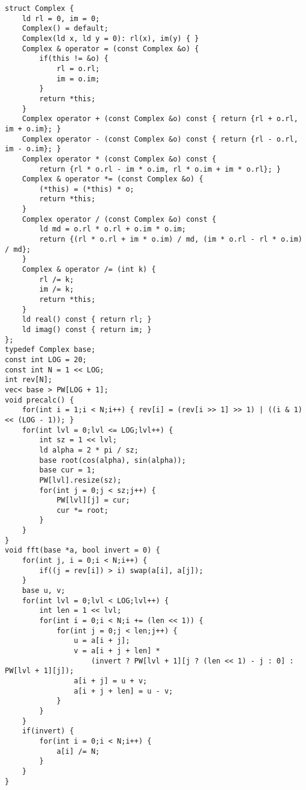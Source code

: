 \documentclass[12pt]{article}
\begin{document}
\begin{verbatim}
struct Complex {
    ld rl = 0, im = 0;
    Complex() = default;
    Complex(ld x, ld y = 0): rl(x), im(y) { }
    Complex & operator = (const Complex &o) {
        if(this != &o) {
            rl = o.rl;
            im = o.im;
        }
        return *this;
    }
    Complex operator + (const Complex &o) const { return {rl + o.rl, im + o.im}; }
    Complex operator - (const Complex &o) const { return {rl - o.rl, im - o.im}; }
    Complex operator * (const Complex &o) const { 
        return {rl * o.rl - im * o.im, rl * o.im + im * o.rl}; }
    Complex & operator *= (const Complex &o) {
        (*this) = (*this) * o;
        return *this;
    }
    Complex operator / (const Complex &o) const {
        ld md = o.rl * o.rl + o.im * o.im;
        return {(rl * o.rl + im * o.im) / md, (im * o.rl - rl * o.im) / md};
    }
    Complex & operator /= (int k) {
        rl /= k;
        im /= k;
        return *this;
    }
    ld real() const { return rl; }
    ld imag() const { return im; }
};
typedef Complex base;
const int LOG = 20;
const int N = 1 << LOG;
int rev[N];
vec< base > PW[LOG + 1];
void precalc() {
    for(int i = 1;i < N;i++) { rev[i] = (rev[i >> 1] >> 1) | ((i & 1) << (LOG - 1)); }
    for(int lvl = 0;lvl <= LOG;lvl++) {
        int sz = 1 << lvl;
        ld alpha = 2 * pi / sz;
        base root(cos(alpha), sin(alpha));
        base cur = 1;
        PW[lvl].resize(sz);
        for(int j = 0;j < sz;j++) {
            PW[lvl][j] = cur;
            cur *= root;
        }
    }
}
void fft(base *a, bool invert = 0) {
    for(int j, i = 0;i < N;i++) {
        if((j = rev[i]) > i) swap(a[i], a[j]);
    }
    base u, v;
    for(int lvl = 0;lvl < LOG;lvl++) {
        int len = 1 << lvl;
        for(int i = 0;i < N;i += (len << 1)) {
            for(int j = 0;j < len;j++) {
                u = a[i + j];
                v = a[i + j + len] * 
                    (invert ? PW[lvl + 1][j ? (len << 1) - j : 0] : PW[lvl + 1][j]);
                a[i + j] = u + v;
                a[i + j + len] = u - v;
            }
        }
    }
    if(invert) {
        for(int i = 0;i < N;i++) {
            a[i] /= N;
        }
    }
}
\end{verbatim}
\end{document}
